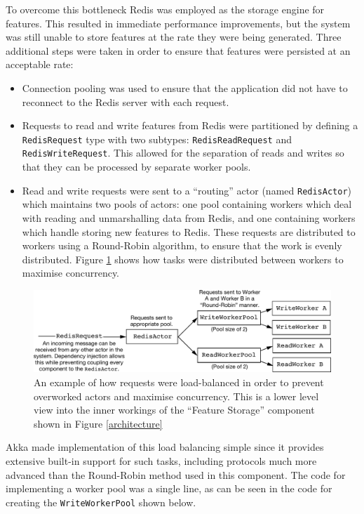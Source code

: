 \documentclass{l4proj}
\newcommand{\code}[1]{\texttt{#1}}
\begin{document}
        To overcome this bottleneck Redis \cite{redis} was employed as the storage engine for features. This resulted in immediate performance improvements, but the system was still unable to store features at the rate they were being generated. Three additional steps were taken in order to ensure that features were persisted at an acceptable rate:
        
        \begin{itemize}
        \item Connection pooling was used to ensure that the application did not have to reconnect to the Redis server with each request.
        \item Requests to read and write features from Redis were partitioned by defining a \code{RedisRequest} type with two subtypes: \code{RedisReadRequest} and \code{RedisWriteRequest}. This allowed for the separation of reads and writes so that they can be processed by separate worker pools.
        \item Read and write requests were sent to a ``routing'' actor (named \code{RedisActor}) which maintains two pools of actors: one pool containing workers which deal with reading and unmarshalling data from Redis, and one containing workers which handle storing new features to Redis. These requests are distributed to workers using a Round-Robin algorithm, to ensure that the work is evenly distributed. Figure \ref{loadbalancing} shows how tasks were distributed between workers to maximise concurrency.
        \end{itemize}


\begin{figure}
\centering
\includegraphics[scale=0.7]{loadbalancing.pdf}
\caption{An example of how requests were load-balanced in order to prevent overworked actors and maximise concurrency. This is a lower level view into the inner workings of the ``Feature Storage'' component shown in Figure \ref{architecture}}
\label{loadbalancing}
\end{figure}
        
        Akka made implementation of this load balancing simple since it provides extensive built-in support for such tasks, including protocols much more advanced than the Round-Robin method used in this component. The code for implementing a worker pool was a single line, as can be seen in the code for creating the \code{WriteWorkerPool} shown below.
        
\end{document}
